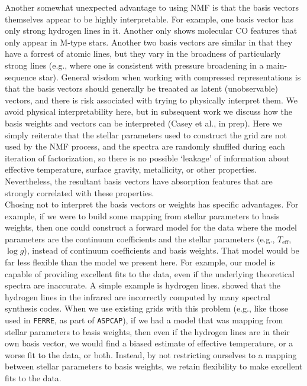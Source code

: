 \documentclass[modern]{aastex631}
\begin{document}
Another somewhat unexpected advantage to using NMF is that the basis vectors themselves appear to be highly interpretable. For example, one basis vector has only strong hydrogen lines in it. Another only shows molecular CO features that only appear in M-type stars. Another two basis vectors are similar in that they have a forrest of atomic lines, but they vary in the broadness of particularly strong lines (e.g., where one is consistent with pressure broadening in a main-sequence star). General wisdom when working with compressed representations is that the basis vectors should generally be treaated as latent (unobservable) vectors, and there is risk associated with trying to physically interpret them. We avoid physical interpretability here, but in subsequent work we discuss how the basis weights and vectors can be interpreted (Casey et al., in prep). Here we simply reiterate that the stellar parameters used to construct the grid are not used by the NMF process, and the spectra are randomly shuffled during each iteration of factorization, so there is no possible `leakage' of information about effective temperature, surface gravity, metallicity, or other properties. Nevertheless, the resultant basis vectors have absorption features that are strongly correlated with these properties. \\

Chosing not to interpret the basis vectors or weights has specific advantages. For example, if we were to build some mapping from stellar parameters to basis weights, then one could construct a forward model for the data where the model parameters are the continuum coefficients and the stellar parameters (e.g., $T_\mathrm{eff}$, $\log{g}$), instead of continuum coefficients and basis weights. That model would be far less flexible than the model we present here. For example, our model is capable of providing excellent fits to the data, even if the underlying theoretical spectra are inaccurate. A simple example is hydrogen lines. \citep{Wheeler} showed that the hydrogen lines in the infrared are incorrectly computed by many spectral synthesis codes. When we use existing grids with this problem (e.g., like those used in \texttt{FERRE}, as part of \texttt{ASPCAP}), if we had a model that was mapping from stellar parameters to basis weights, then even if the hydrogen lines are in their own basis vector, we would find a biased estimate of effective temperature, or a worse fit to the data, or both. Instead, by not restricting ourselves to a mapping between stellar parameters to basis weights, we retain flexibility to make excellent fits to the data.\\
\end{document}
